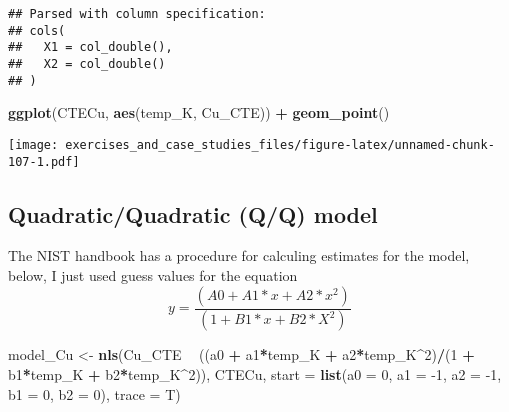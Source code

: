 \documentclass[]{book}
\newenvironment{Shaded}{\begin{snugshade}}{\end{snugshade}}
\newcommand{\DataTypeTok}[1]{\textcolor[rgb]{0.13,0.29,0.53}{#1}}
\newcommand{\DecValTok}[1]{\textcolor[rgb]{0.00,0.00,0.81}{#1}}
\newcommand{\KeywordTok}[1]{\textcolor[rgb]{0.13,0.29,0.53}{\textbf{#1}}}
\newcommand{\NormalTok}[1]{#1}
\newcommand{\OperatorTok}[1]{\textcolor[rgb]{0.81,0.36,0.00}{\textbf{#1}}}
\newcommand{\StringTok}[1]{\textcolor[rgb]{0.31,0.60,0.02}{#1}}
\theoremstyle{definition}
\theoremstyle{definition}
\theoremstyle{definition}
\theoremstyle{remark}
\begin{document}
\begin{verbatim}
## Parsed with column specification:
## cols(
##   X1 = col_double(),
##   X2 = col_double()
## )
\end{verbatim}

\begin{Shaded}
\end{Shaded}

\begin{Shaded}
\begin{Highlighting}[]
\KeywordTok{ggplot}\NormalTok{(CTECu, }\KeywordTok{aes}\NormalTok{(temp_K, Cu_CTE)) }\OperatorTok{+}\StringTok{ }
\StringTok{  }\KeywordTok{geom_point}\NormalTok{()}
\end{Highlighting}
\end{Shaded}

\texttt{[image: exercises\_and\_case\_studies\_files/figure-latex/unnamed-chunk-107-1.pdf]}

\hypertarget{quadraticquadratic-qq-model}{%
\subsection{Quadratic/Quadratic (Q/Q)
model}\label{quadraticquadratic-qq-model}}

The NIST handbook has a procedure for calculing estimates for the model,
below, I just used guess values for the equation \[
y = \frac{(A0 + A1*x + A2*x^2)}{(1 + B1*x + B2*X^2)}
\]

\begin{Shaded}
\begin{Highlighting}[]
\NormalTok{model_Cu <-}\StringTok{ }\KeywordTok{nls}\NormalTok{(Cu_CTE }\OperatorTok{~}\StringTok{ }\NormalTok{((a0 }\OperatorTok{+}\StringTok{ }\NormalTok{a1}\OperatorTok{*}\NormalTok{temp_K }\OperatorTok{+}\StringTok{ }\NormalTok{a2}\OperatorTok{*}\NormalTok{temp_K}\OperatorTok{^}\DecValTok{2}\NormalTok{)}\OperatorTok{/}\NormalTok{(}\DecValTok{1} \OperatorTok{+}\StringTok{ }\NormalTok{b1}\OperatorTok{*}\NormalTok{temp_K }\OperatorTok{+}\StringTok{ }\NormalTok{b2}\OperatorTok{*}\NormalTok{temp_K}\OperatorTok{^}\DecValTok{2}\NormalTok{)), }
\NormalTok{            CTECu, }\DataTypeTok{start =} \KeywordTok{list}\NormalTok{(}\DataTypeTok{a0 =} \DecValTok{0}\NormalTok{, }\DataTypeTok{a1 =} \DecValTok{-1}\NormalTok{, }\DataTypeTok{a2 =} \DecValTok{-1}\NormalTok{, }\DataTypeTok{b1 =} \DecValTok{0}\NormalTok{, }\DataTypeTok{b2 =} \DecValTok{0}\NormalTok{), }\DataTypeTok{trace =}\NormalTok{ T)}
\end{Highlighting}
\end{Shaded}
\end{document}

